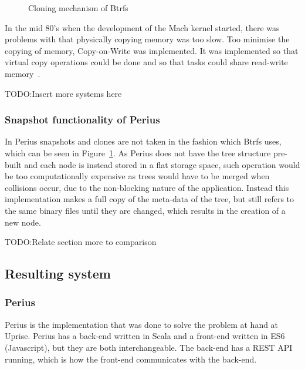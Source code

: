 \documentclass[a4paper,12pt]{article}
\newcounter{subsubsubsection}[subsubsection]
\newcommand{\fix}{\colorbox{yellow!30}{TODO:}}
\begin{document}
\begin{figure}[htp] 
    \caption{Cloning mechanism of Btrfs~\cite{BTRFS}}
    \label{fig:btrfs_tree}
\end{figure}

In the mid 80's when the development of the Mach kernel started, there was problems with that
physically copying memory was too slow. Too minimise the copying of memory, Copy-on-Write was
implemented. It was implemented so that virtual copy operations could be done and so that tasks
could share read-write memory~\cite{MACH}.


\fix Insert more systems here

\subsubsection{Snapshot functionality of Perius}
In Perius snapshots and clones are not taken in the fashion which Btrfs uses, which can be seen in
Figure~\ref{fig:btrfs_tree}. As Perius does not have the tree structure pre-built and each node is
instead stored in a flat storage space, such operation would be too computationally expensive as
trees would have to be merged when collisions occur, due to the non-blocking nature of the
application. Instead this implementation makes a full copy of the meta-data of the tree, but still
refers to the same binary files until they are changed, which results in the creation of a new node.

\fix Relate section more to comparison

\subsection{Resulting system}
\subsubsection{Perius}
Perius is the implementation that was done to solve the problem at hand at Uprise. Perius has a
back-end written in Scala and a front-end written in ES6 (Javascript), but they are both
interchangeable.  The back-end has a REST API running, which is how the front-end communicates with
the back-end.
\end{document}
